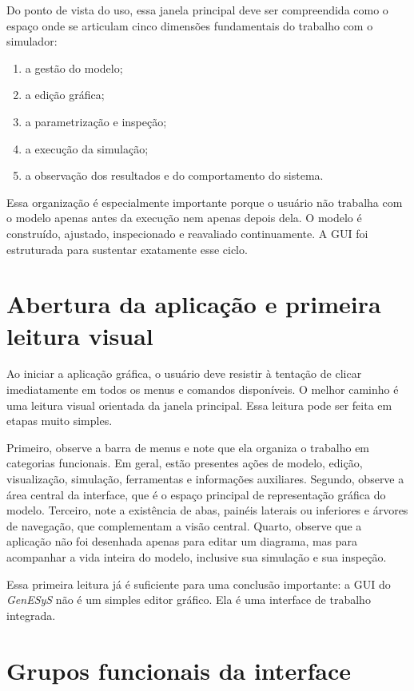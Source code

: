 Do ponto de vista do uso, essa janela principal deve ser compreendida como o espaço onde se articulam cinco dimensões fundamentais do trabalho com o simulador:

\begin{enumerate}
    \item a gestão do modelo;
    \item a edição gráfica;
    \item a parametrização e inspeção;
    \item a execução da simulação;
    \item a observação dos resultados e do comportamento do sistema.
\end{enumerate}

Essa organização é especialmente importante porque o usuário não trabalha com o modelo apenas antes da execução nem apenas depois dela. O modelo é construído, ajustado, inspecionado e reavaliado continuamente. A GUI foi estruturada para sustentar exatamente esse ciclo.

\section{Abertura da aplicação e primeira leitura visual}
\label{sec:cap3_abertura_e_leitura_visual}

Ao iniciar a aplicação gráfica, o usuário deve resistir à tentação de clicar imediatamente em todos os menus e comandos disponíveis. O melhor caminho é uma leitura visual orientada da janela principal. Essa leitura pode ser feita em etapas muito simples.

Primeiro, observe a barra de menus e note que ela organiza o trabalho em categorias funcionais. Em geral, estão presentes ações de modelo, edição, visualização, simulação, ferramentas e informações auxiliares. Segundo, observe a área central da interface, que é o espaço principal de representação gráfica do modelo. Terceiro, note a existência de abas, painéis laterais ou inferiores e árvores de navegação, que complementam a visão central. Quarto, observe que a aplicação não foi desenhada apenas para editar um diagrama, mas para acompanhar a vida inteira do modelo, inclusive sua simulação e sua inspeção.

Essa primeira leitura já é suficiente para uma conclusão importante: a GUI do \textit{GenESyS} não é um simples editor gráfico. Ela é uma interface de trabalho integrada.

\section{Grupos funcionais da interface}
\label{sec:cap3_grupos_funcionais_interface}

